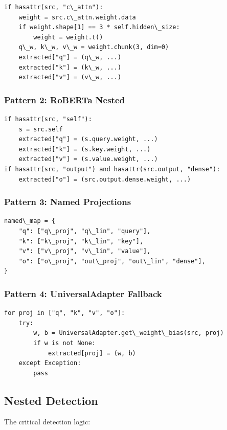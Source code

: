 \begin{lstlisting}
if hasattr(src, "c\_attn"):
    weight = src.c\_attn.weight.data
    if weight.shape[1] == 3 * self.hidden\_size:
        weight = weight.t()
    q\_w, k\_w, v\_w = weight.chunk(3, dim=0)
    extracted["q"] = (q\_w, ...)
    extracted["k"] = (k\_w, ...)
    extracted["v"] = (v\_w, ...)
\end{lstlisting}

\subsubsection{Pattern 2: RoBERTa Nested}

\begin{lstlisting}
if hasattr(src, "self"):
    s = src.self
    extracted["q"] = (s.query.weight, ...)
    extracted["k"] = (s.key.weight, ...)
    extracted["v"] = (s.value.weight, ...)
if hasattr(src, "output") and hasattr(src.output, "dense"):
    extracted["o"] = (src.output.dense.weight, ...)
\end{lstlisting}

\subsubsection{Pattern 3: Named Projections}

\begin{lstlisting}
named\_map = {
    "q": ["q\_proj", "q\_lin", "query"],
    "k": ["k\_proj", "k\_lin", "key"],
    "v": ["v\_proj", "v\_lin", "value"],
    "o": ["o\_proj", "out\_proj", "out\_lin", "dense"],
}
\end{lstlisting}

\subsubsection{Pattern 4: UniversalAdapter Fallback}

\begin{lstlisting}
for proj in ["q", "k", "v", "o"]:
    try:
        w, b = UniversalAdapter.get\_weight\_bias(src, proj)
        if w is not None:
            extracted[proj] = (w, b)
    except Exception:
        pass
\end{lstlisting}

\subsection{Nested Detection}

The critical detection logic:

